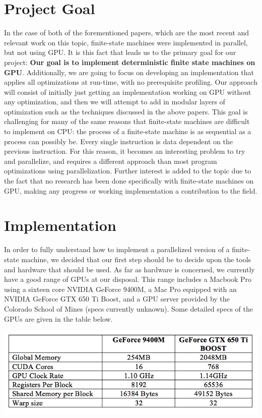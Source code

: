 \documentclass[11pt]{sigplanconf}
\begin{document}
\section{Project Goal}

In the case of both of the forementioned papers, which are the most recent and relevant work on this topic, finite-state machines were implemented in parallel, but not using GPU. It is this fact that leads us to the primary goal for our project: \textbf{Our goal is to implement deterministic finite state machines on GPU}. Additionally, we are going to focus on developing an implementation that applies all optimizations at run-time, with no prerequisite profiling. Our approach will consist of initially just getting an implementation working on GPU without any optimization, and then we will attempt to add in modular layers of optimization such as the techniques discussed in the above papers. This goal is challenging for many of the same reasons that finite-state machines are difficult to implement on CPU: the process of a finite-state machine is as sequential as a process can possibly be. Every single instruction is data dependent on the previous instruction. For this reason, it becomes an interesting problem to try and parallelize, and requires a different approach than most program optimizations using parallelization. Further interest is added to the topic due to the fact that no research has been done specifically with finite-state machines on GPU, making any progress or working implementation a contribution to the field. 

\section{Implementation}

In order to fully understand how to implement a parallelized version of a finite-state machine, we decided that our first step should be to decide upon the tools and hardware that should be used. As far as hardware is concerned, we currently have a good range of GPUs at our disposal. This range includes a Macbook Pro using a sixteen core NVIDIA GeForce 9400M, a Mac Pro equipped with an NVIDIA GeForce GTX 650 Ti Boost, and a GPU server provided by the Colorado School of Mines (specs currently unknown). Some detailed specs of the GPUs are given in the table below.

\includegraphics[width=\linewidth]{gpu_specs.png}
\end{document}
